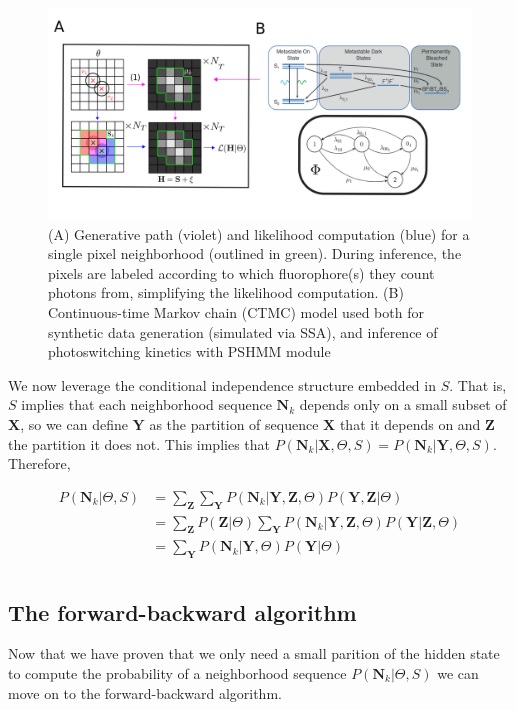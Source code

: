 \documentclass{ucetd}
\begin{document}
\begin{figure}
\includegraphics[scale=0.325]{Schematic.png}
\caption{(A) Generative path (violet) and likelihood computation (blue) for a single pixel neighborhood (outlined in green). During inference, the pixels are labeled according to which fluorophore(s) they count photons from, simplifying the likelihood computation. (B) Continuous-time Markov chain (CTMC) model used both for synthetic data generation (simulated via SSA), and inference of photoswitching kinetics with PSHMM module}
\end{figure}

We now leverage the conditional independence structure embedded in $S$. That is, $S$ implies that each neighborhood sequence  $\bm{N}_{k}$ depends only on a small subset of $\bm{X}$, so we can define $\bm{Y}$ as the partition of sequence $\bm{X}$ that it depends on and $\bm{Z}$ the partition it does not. This implies that $P(\bm{N}_{k}|\bm{X},\Theta,S) = P(\bm{N}_{k}|\bm{Y},\Theta,S)$. Therefore,

\begin{align*}
P(\bm{N}_{k}|\Theta,S) &= \sum_{\bm{Z}}\sum_{\bm{Y}}P(\bm{N}_{k}|\bm{Y},\bm{Z},\Theta)P(\bm{Y},\bm{Z}|\Theta)\\
&= \sum_{\bm{Z}}P(\bm{Z}|\Theta)\sum_{\bm{Y}}P(\bm{N}_{k}|\bm{Y},\bm{Z},\Theta)P(\bm{Y}|\bm{Z},\Theta)\\
&= \sum_{\bm{Y}}P(\bm{N}_{k}|\bm{Y},\Theta)P(\bm{Y}|\Theta)\\
\end{align*}

\subsection{The forward-backward algorithm}

Now that we have proven that we only need a small parition of the hidden state to compute the probability of a neighborhood sequence $P(\bm{N}_{k}|\Theta,S)$ we can move on to the forward-backward algorithm.
\end{document}
